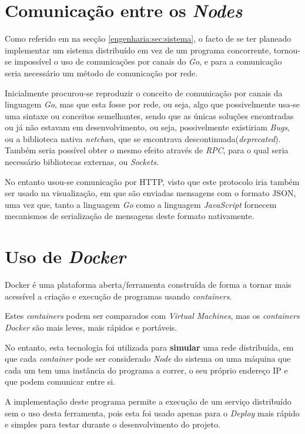 \section{Comunicação entre os \emph{Nodes}}
\label{engenharia:sec:comunicação}
Como referido em na secção \ref{engenharia:sec:sistema}, o facto de se ter planeado implementar um sistema distribuído
em vez de um programa concorrente, tornou-se impossível o uso de comunicações por canais do \emph{Go}, 
e para a comunicação seria necessário um método de comunicação por rede.

Inicialmente procurou-se reproduzir o conceito de comunicação por canais da linguagem \emph{Go}, mas que esta fosse por rede, ou seja, algo que possivelmente
usa-se uma sintaxe ou conceitos semelhantes, sendo que as únicas soluções encontradas ou já não estavam em desenvolvimento, ou seja, possivelmente existiriam \emph{Bugs}, 
ou a biblioteca nativa \emph{netchan}, que se encontrava descontinuada(\emph{deprecated}). 
Também seria possível obter o mesmo efeito através de \emph{RPC}, para o qual seria necessário bibliotecas externas, 
ou \emph{Sockets}.

No entanto usou-se comunicação por \acs*{HTTP}, visto que este protocolo iria também ser usado na visualização, em que são enviadas mensagens com o formato \acs*{JSON}, uma vez que, tanto a linguagem \emph{Go} como a linguagem 
\emph{JavaScript} fornecem mecanismos de serialização de mensagens deste formato nativamente.


\section{Uso de \emph{Docker}}
Docker é uma plataforma aberta/ferramenta construída de forma a tornar mais acessível a criação e execução de programas  usando \emph{containers}.

Estes \emph{containers} podem ser comparados com \emph{Virtual Machines}, mas os \emph{containers} \emph{Docker} são mais leves, mais rápidos e portáveis.

No entanto, esta tecnologia foi utilizada para \textbf{simular} uma rede distribuída,
em que cada \emph{container} pode ser considerado \emph{Node} do sistema ou uma máquina que cada um tem uma instância do programa a correr,
o seu próprio endereço \acs{IP} e que podem comunicar entre si.

A implementação deste programa permite a execução de um serviço distribuído sem o uso desta ferramenta, pois esta foi
usado apenas para o \emph{Deploy} mais rápido e simples para testar durante o desenvolvimento do projeto.

